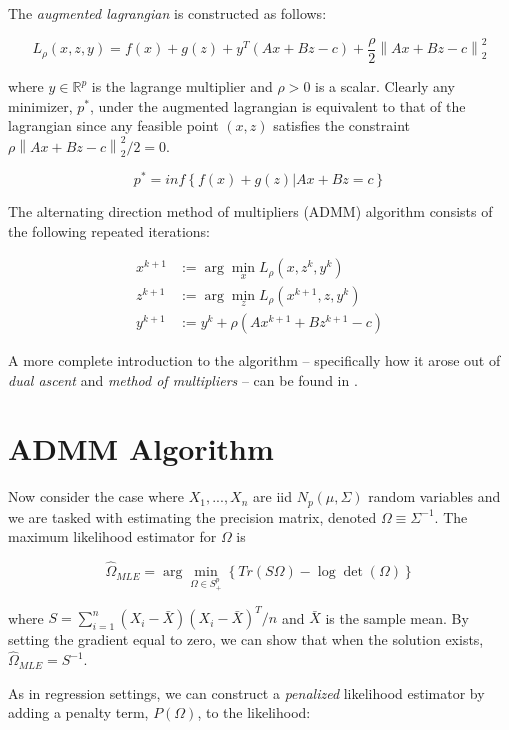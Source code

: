 \documentclass[11pt,]{book}
\theoremstyle{definition}
\theoremstyle{definition}
\theoremstyle{definition}
\theoremstyle{remark}
\begin{document}
The \emph{augmented lagrangian} is constructed as follows:

\[ L_{\rho}(x, z, y) = f(x) + g(z) + y^{T}(Ax + Bz - c) + \frac{\rho}{2}\left\| Ax + Bz - c \right\|_{2}^{2} \]

where \(y \in \mathbb{R}^{p}\) is the lagrange multiplier and
\(\rho > 0\) is a scalar. Clearly any minimizer, \(p^{*}\), under the
augmented lagrangian is equivalent to that of the lagrangian since any
feasible point \((x, z)\) satisfies the constraint
\(\rho\left\| Ax + Bz - c \right\|_{2}^{2}/2 = 0\).

\[ p^{*} = inf\left\{ f(x) + g(z) | Ax + Bz = c \right\} \]

The alternating direction method of multipliers (ADMM) algorithm
consists of the following repeated iterations:

\begin{align}
  x^{k + 1} &:= \arg\min_{x}L_{\rho}(x, z^{k}, y^{k}) \\
  z^{k + 1} &:= \arg\min_{z}L_{\rho}(x^{k + 1}, z, y^{k}) \\
  y^{k + 1} &:= y^{k} + \rho(Ax^{k + 1} + Bz^{k + 1} - c)
\end{align}

A more complete introduction to the algorithm -- specifically how it
arose out of \emph{dual ascent} and \emph{method of multipliers} -- can
be found in \citet{boyd2011distributed}.

\vspace{1cm}

\hypertarget{admm-algorithm}{%
\section{ADMM Algorithm}\label{admm-algorithm}}

Now consider the case where \(X_{1}, ..., X_{n}\) are iid
\(N_{p}(\mu, \Sigma)\) random variables and we are tasked with
estimating the precision matrix, denoted \(\Omega \equiv \Sigma^{-1}\).
The maximum likelihood estimator for \(\Omega\) is

\[ \hat{\Omega}_{MLE} = \arg\min_{\Omega \in S_{+}^{p}}\left\{ Tr\left(S\Omega\right) - \log \det\left(\Omega \right) \right\} \]

where \(S = \sum_{i = 1}^{n}(X_{i} - \bar{X})(X_{i} - \bar{X})^{T}/n\)
and \(\bar{X}\) is the sample mean. By setting the gradient equal to
zero, we can show that when the solution exists,
\(\hat{\Omega}_{MLE} = S^{-1}\).

As in regression settings, we can construct a \emph{penalized}
likelihood estimator by adding a penalty term,
\(P\left( \Omega \right)\), to the likelihood:
\end{document}
